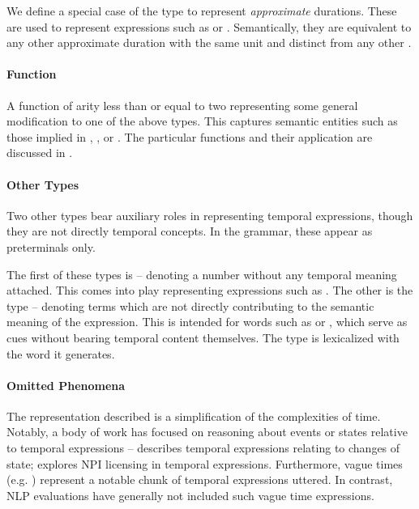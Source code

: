 We define a special case of the  type to represent 
	\textit{approximate} durations.
These are used to represent expressions such as  or
	.
Semantically, they are equivalent to any other approximate
	duration with the same unit and distinct from any other .

\paragraph{Function}
A function of arity less than or equal to two representing some
	general modification to one of the above types.
This captures semantic entities such as those implied in
	, , or .
The particular functions and their application are discussed in 
	.


\paragraph{Other Types}
Two other types bear auxiliary roles in representing temporal expressions,
	though they are not directly temporal concepts.
In the grammar, these appear as preterminals only.

The first of these types is  -- denoting a number without
	any temporal meaning attached.
This comes into play representing expressions such as .
The other is the  type -- denoting terms which are not
	directly contributing to the semantic meaning of the expression.
This is intended for words such as  or , which serve as cues
	without bearing temporal content themselves.
The  type is lexicalized with the word it generates.


\paragraph{Omitted Phenomena}
The representation described is a simplification of the complexities of
	time.
Notably, a body of work has focused on reasoning about events or states
	relative to temporal expressions -- 
	 describes temporal expressions relating to
	changes of state; 
	 explores NPI licensing in temporal
	expressions.
Furthermore, vague times (e.g. ) represent a notable chunk of 
	temporal expressions uttered.
In contrast, NLP evaluations have generally not included such vague 
	time expressions.

